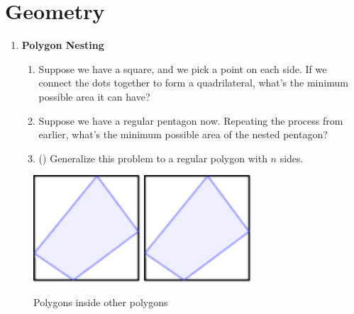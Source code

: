 \documentclass[11pt]{scrartcl}
\begin{document}
\newpage
\section{Geometry}
\begin{enumerate}[label=\textbf{G\arabic*}.]
    \item \textbf{Polygon Nesting} \newline
    \begin{enumerate} 
        \item Suppose we have a square, and we pick a point on each side. If we connect the dots together to form a quadrilateral, what's the minimum possible area it can have?
        
        \item Suppose we have a regular pentagon now. Repeating the process from earlier, what's the minimum possible area of the nested pentagon?
        
        \item (\fullchili) Generalize this problem to a regular polygon with $n$ sides.
    \end{enumerate}
\end{enumerate}

\begin{figure}[h]
        \centering
        \includegraphics[width = 4cm, page=1]{weekly/week 11/Diagrams/minarea.pdf}
        \hspace{2em}
        \includegraphics[width = 4cm, page=2]{weekly/week 11/Diagrams/minarea.pdf}
        \caption{Polygons inside other polygons}
        \label{fig:minarea}
\end{figure}

\newpage
\end{document}
